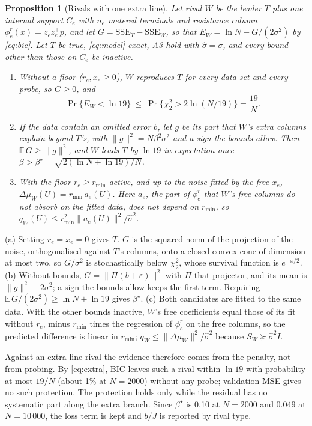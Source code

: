 \documentclass[journal,onecolumn,11pt]{IEEEtran}
\newtheorem{proposition}{Proposition}
\newcommand{\E}{\mathbb{E}}
\newcommand{\tp}{^{\top}}
\begin{document}
\begin{proposition}[Rivals with one extra line]\label{prop:extra}
Let rival $W$ be the leader $T$ plus one internal support $C_e$ with $n_e$ metered terminals and resistance column $\phi^r_e(x)=z_ez_e\tp p$, and let $G=\mathrm{SSE}_T-\mathrm{SSE}_W$, so that $E_W=\ln N-G/(2\sigma^2)$ by \eqref{eq:bic}. Let $T$ be true, \eqref{eq:model} exact, A3 hold with $\hat\sigma=\sigma$, and every bound other than those on $C_e$ be inactive.
\begin{enumerate}
\item[(a)] Without a floor ($r_e,x_e\ge0$), $W$ reproduces $T$ for every data set and every probe, so $G\ge0$, and
\begin{equation}\label{eq:extra}
\Pr\{E_W<\ln19\}\ \le\ \Pr\{\chi^2_2>2\ln(N/19)\}=\frac{19}{N}.
\end{equation}
\item[(b)] If the data contain an omitted error $b$, let $g$ be its part that $W$'s extra columns explain beyond $T$'s, with $\|g\|^2=N\beta^2\sigma^2$ and a sign the bounds allow. Then $\E\,G\ge\|g\|^2$, and $W$ leads $T$ by $\ln19$ in expectation once $\beta>\beta^\star=\sqrt{2(\ln N+\ln19)/N}$.
\item[(c)] With the floor $r_e\ge r_{\min}$ active, and up to the noise fitted by the free $x_e$, $\Delta\mu_W(U)=r_{\min}\,a_e(U)$. Here $a_e$, the part of $\phi^r_e$ that $W$'s free columns do not absorb on the fitted data, does not depend on $r_{\min}$, so $q_W(U)\le r_{\min}^2\|a_e(U)\|^2/\hat\sigma^2$.
\end{enumerate}
\end{proposition}
\begin{IEEEproof}
(a) Setting $r_e=x_e=0$ gives $T$. $G$ is the squared norm of the projection of the noise, orthogonalised against $T$'s columns, onto a closed convex cone of dimension at most two, so $G/\sigma^2$ is stochastically below $\chi^2_2$, whose survival function is $e^{-x/2}$. (b) Without bounds, $G=\|\Pi(b+\varepsilon)\|^2$ with $\Pi$ that projector, and its mean is $\|g\|^2+2\sigma^2$; a sign the bounds allow keeps the first term. Requiring $\E\,G/(2\sigma^2)\ge\ln N+\ln19$ gives $\beta^\star$. (c) Both candidates are fitted to the same data. With the other bounds inactive, $W$'s free coefficients equal those of its fit without $r_e$, minus $r_{\min}$ times the regression of $\phi^r_e$ on the free columns, so the predicted difference is linear in $r_{\min}$; $q_W\le\|\Delta\mu_W\|^2/\hat\sigma^2$ because $\bar S_W\succeq\hat\sigma^2I$.
\end{IEEEproof}
Against an extra-line rival the evidence therefore comes from the penalty, not from probing. By \eqref{eq:extra}, BIC leaves such a rival within $\ln19$ with probability at most $19/N$ (about 1\% at $N=2000$) without any probe; validation MSE gives no such protection. The protection holds only while the residual has no systematic part along the extra branch. Since $\beta^\star$ is 0.10 at $N=2000$ and 0.049 at $N=10\,000$, the loss term is kept and $b/J$ is reported by rival type.
\end{document}
